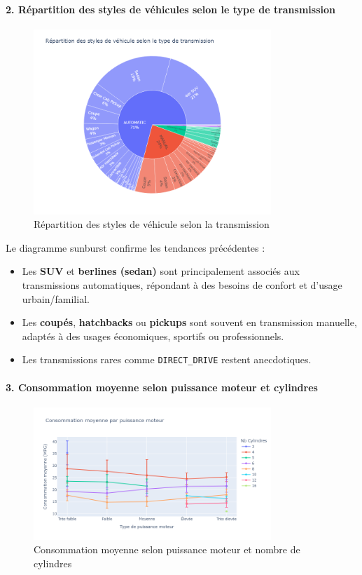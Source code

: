 \documentclass[12pt]{report}
\begin{document}
\paragraph{2. Répartition des styles de véhicules selon le type de transmission}\mbox{}

\begin{figure}[H]
\centering
\includegraphics[width=0.8\textwidth]{transmission_style_sunburst.png}
\caption{Répartition des styles de véhicule selon la transmission}
\end{figure}

Le diagramme sunburst confirme les tendances précédentes :
\begin{itemize}
  \item Les \textbf{SUV} et \textbf{berlines (sedan)} sont principalement associés aux transmissions automatiques, répondant à des besoins de confort et d’usage urbain/familial.
  \item Les \textbf{coupés}, \textbf{hatchbacks} ou \textbf{pickups} sont souvent en transmission manuelle, adaptés à des usages économiques, sportifs ou professionnels.
  \item Les transmissions rares comme \texttt{DIRECT\_DRIVE} restent anecdotiques.
\end{itemize}

\paragraph{3. Consommation moyenne selon puissance moteur et cylindres}\mbox{}

\begin{figure}[H]
\centering
\includegraphics[width=0.8\textwidth]{hp_vs_cylinders.png}
\caption{Consommation moyenne selon puissance moteur et nombre de cylindres}
\end{figure}
\end{document}
